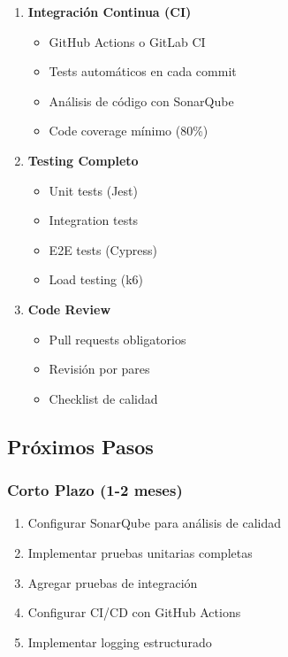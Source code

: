 \documentclass[12pt,a4paper]{article}
\begin{document}
\begin{enumerate}[leftmargin=*]
    \item \textbf{Integración Continua (CI)}
    \begin{itemize}
        \item GitHub Actions o GitLab CI
        \item Tests automáticos en cada commit
        \item Análisis de código con SonarQube
        \item Code coverage mínimo (80\%)
    \end{itemize}

    \item \textbf{Testing Completo}
    \begin{itemize}
        \item Unit tests (Jest)
        \item Integration tests
        \item E2E tests (Cypress)
        \item Load testing (k6)
    \end{itemize}

    \item \textbf{Code Review}
    \begin{itemize}
        \item Pull requests obligatorios
        \item Revisión por pares
        \item Checklist de calidad
    \end{itemize}
\end{enumerate}

\subsection{Próximos Pasos}

\subsubsection{Corto Plazo (1-2 meses)}

\begin{enumerate}[leftmargin=*]
    \item Configurar SonarQube para análisis de calidad
    \item Implementar pruebas unitarias completas
    \item Agregar pruebas de integración
    \item Configurar CI/CD con GitHub Actions
    \item Implementar logging estructurado
\end{enumerate}
\end{document}
